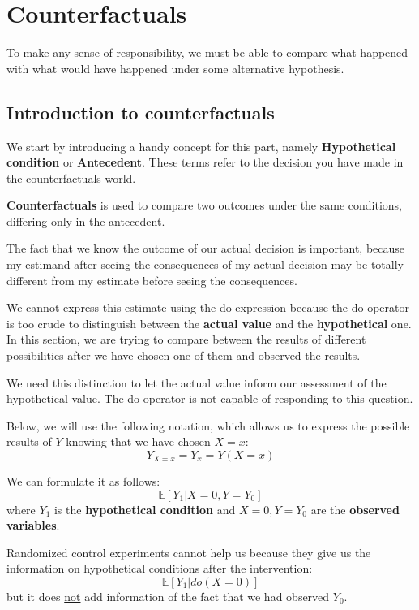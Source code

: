 \chapter{Counterfactuals}
To make any sense of responsibility, we must be able to compare what happened
with what would have happened under some alternative hypothesis.
\section{Introduction to counterfactuals}
We start by introducing a handy concept for this part, namely \textbf{Hypothetical
    condition} or \textbf{Antecedent}. These terms refer to the decision you
have made in the counterfactuals world.

\textbf{Counterfactuals} is used to compare two outcomes under the same
conditions, differing only in the antecedent.

The fact that we know the outcome of our actual decision is important, because
my estimand after seeing the consequences of my actual decision may be totally
different from my estimate before seeing the consequences.

We cannot express this estimate using the do-expression because the do-operator
is too crude to distinguish between the \textbf{actual value} and the
\textbf{hypothetical} one. In this section, we are trying to compare between the
results of different possibilities after we have chosen one of them and observed
the results.

We need this distinction to let the actual value inform our assessment of the
hypothetical value. The do-operator is not capable of responding to this question.

Below, we will use the following notation, which allows us to express the possible
results of $Y$ knowing that we have chosen $X = x$:
\begin{equation}
    Y_{X = x} = Y_x = Y(X = x)
\end{equation}

We can formulate it as follows:
\begin{equation}
    \mathbb{E}[Y_1 | X = 0, Y = Y_0]
\end{equation}
where $Y_1$ is the \textbf{hypothetical condition} and $X = 0,Y = Y_0$ are the
\textbf{observed variables}.

\begin{note}
    Randomized control experiments cannot help us because they give us the information
    on hypothetical conditions after the intervention:
    \begin{equation*}
        \mathbb{E}[Y_1 | do(X = 0)]
    \end{equation*}
    but it does \underline{not} add information of the fact that we had observed $Y_0$.
\end{note}

